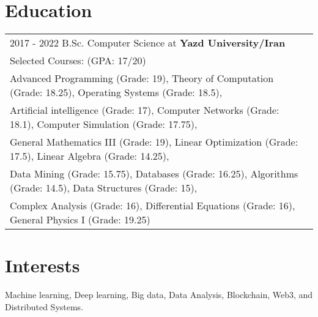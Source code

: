 \documentclass[a4paper,12pt]{article}
\begin{document}
\section{Education}
\begin{tabularx}{\linewidth}{@{}l X@{}}	

2017 - 2022 \normalsize \hspace{1cm}  B.Sc. Computer Science at \textbf{Yazd University/Iran} \\

Selected Courses:   \hfill (GPA: 17/20) \\ 
\scriptsize \hspace{3cm} Advanced Programming (Grade: 19), Theory of Computation (Grade: 18.25), Operating Systems (Grade: 18.5),\\
\scriptsize \hspace{3cm} Artificial intelligence (Grade: 17), Computer Networks (Grade: 18.1), Computer Simulation (Grade: 17.75),\\
\scriptsize \hspace{3cm} General Mathematics III (Grade: 19), Linear Optimization (Grade: 17.5), Linear Algebra (Grade: 14.25),\\
\scriptsize \hspace{3cm} Data Mining (Grade: 15.75), Databases (Grade: 16.25), Algorithms (Grade: 14.5), Data Structures (Grade: 15),\\
\scriptsize \hspace{3cm} Complex Analysis (Grade: 16), Differential Equations (Grade: 16), General Physics I (Grade: 19.25)\\

\end{tabularx}




\section{Interests}
Machine learning, Deep learning, Big data, Data Analysis, Blockchain, Web3, and Distributed Systems.\\
\end{document}
